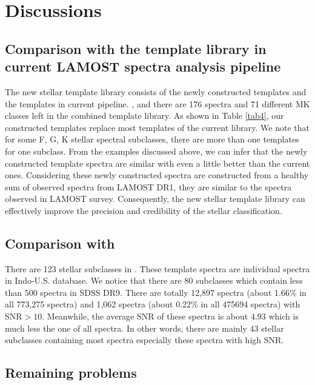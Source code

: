 \documentclass[manuscript]{aastex}
\begin{document}
\section{Discussions}
\subsection{Comparison with the  template library in current LAMOST spectra analysis pipeline}
The new stellar template library consists of the  newly constructed templates and the templates in current pipeline.
, and there are 176 spectra and 71 different MK classes  left in the combined template library.
As shown in Table \ref{tab4},
our constructed templates replace most templates of the  current library.
We note that for some F, G, K  stellar spectral subclasses, there are more than one templates for one subclass.
From the examples discussed above,
we can infer that the newly constructed template spectra are similar with even a little better than the current ones.
Considering these newly constructed spectra are constructed from  a healthy sum of observed spectra from  LAMOST DR1,
they are  similar to the spectra observed in LAMOST survey.
Consequently, the new stellar template library can effectively improve the precision  and credibility  of the stellar classification.

\subsection{Comparison with  \citet{bolton2012spectral}}


There are 123 stellar subclasses in  \citet{bolton2012spectral}.
These template spectra  are individual spectra in  Indo-U.S. database.
We notice that there are 80 subclasses which contain less than 500 spectra in SDSS DR9.
There are totally 12,897 spectra (about 1.66\% in all 773,275 spectra) and 1,062 spectra (about 0.22\% in all 475694 spectra) with SNR$>10$.
Meanwhile, the average SNR of these spectra is about 4.93 which is much less the one of all spectra.
In other words, there are mainly 43 stellar subclasses containing most spectra especially these spectra with high SNR.

\subsection{Remaining problems}
\end{document}
